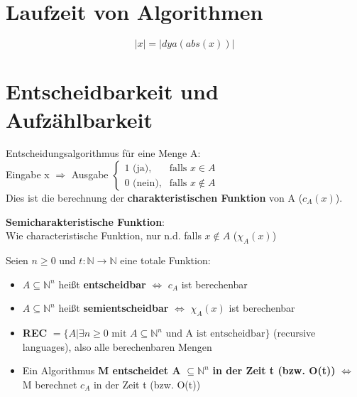 \documentclass[14pt]{article}
\begin{document}
\section{Laufzeit von Algorithmen}
\begin{definition}
    \[
        |x| = |dya(abs(x))|
    \]
\end{definition}

\section{Entscheidbarkeit und Aufzählbarkeit}
\begin{definition}[Entscheidungsalgorithmus]
    Entscheidungsalgorithmus für eine Menge A: \\
    \indent Eingabe x $\Rightarrow$ Ausgabe
    $
        \begin{cases}
            1 \text{ (ja),}   & \text{falls } x \in A    \\
            0 \text{ (nein),} & \text{falls } x \notin A
        \end{cases}
    $ \\
    Dies ist die berechnung der \textbf{charakteristischen Funktion}
    von A ($c_A(x)$).
\end{definition}
\textbf{Semicharakteristische Funktion}: \\
Wie characteristische Funktion, nur n.d. falls $x \notin A$ ($\chi_A(x)$)
\begin{definition}[Entscheidbarkeit]
    Seien $n \geq 0$ und $t: \mathbb{N} \rightarrow \mathbb{N}$ eine
    totale Funktion:
    \begin{itemize}
        \item $A \subseteq \mathbb{N}^n$ heißt \textbf{entscheidbar}
              $\Leftrightarrow$ $c_A$ ist berechenbar
        \item $A \subseteq \mathbb{N}^n$ heißt \textbf{semientscheidbar}
              $\Leftrightarrow$ $\chi_A(x)$ ist berechenbar
        \item \textbf{REC} $= \{ A | \exists n\geq 0 \text{ mit } A
                  \subseteq \mathbb{N}^n \text{ und A ist entscheidbar}\}$
              (recursive languages), also alle berechenbaren Mengen
        \item Ein Algorithmus \textbf{M entscheidet A} $\subseteq
                  \mathbb{N}^n$ \textbf{in der Zeit t (bzw. O(t))} $\Leftrightarrow$
              M berechnet $c_A$ in der Zeit t (bzw. O(t))
    \end{itemize}
\end{definition}
\end{document}
